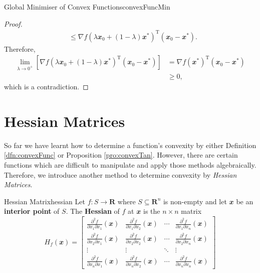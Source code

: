\documentclass[math, code]{amznotes}
\theoremstyle{remark}
\begin{document}
\begin{thmbox}{Global Minimiser of Convex Functions}{convexFuncMin}
\begin{proof}
\begin{align*}
            & \leq \nabla f\left(\lambda\mathbfit{x}_0 + (1 - \lambda)\mathbfit{x}^*\right)^{\mathrm{T}}(\mathbfit{x_0 - x^*}).
        \end{align*}
        Therefore,
        \begin{align*}
            \lim_{\lambda \to 0^+}\left[\nabla f\left(\lambda\mathbfit{x}_0 + (1 - \lambda)\mathbfit{x}^*\right)^{\mathrm{T}}(\mathbfit{x_0 - x^*})\right] & = \nabla f(\mathbfit{x}^*)^{\mathrm{T}}(\mathbfit{x_0 - x^*}) \\
            & \geq 0,
        \end{align*}
        which is a contradiction.
    \end{proof}
\end{thmbox}

\section{Hessian Matrices}
So far we have learnt how to determine a function's convexity by either Definition \ref{dfn:convexFunc} or Proposition \ref{pro:convexTan}. However, there are certain functions which are difficult to manipulate and apply those methods algebraically. Therefore, we introduce another method to determine convexity by \textit{Hessian Matrices}.
\begin{dfnbox}{Hessian Matrix}{hessian}
    Let $f \colon S \to \mathbf{R}$ where $S \subseteq \mathbf{R}^n$ is non-empty and let $\mathbfit{x}$ be an {\color{red} \textbf{interior point}} of $S$. The {\color{red} \textbf{Hessian}} of $f$ at $\mathbfit{x}$ is the $n \times n$ matrix
    \begin{displaymath}
        H_f(\mathbfit{x}) = \begin{bmatrix}
            \frac{\partial^2f}{\partial x_1 \partial x_1}(\mathbfit{x}) & \frac{\partial^2f}{\partial x_1 \partial x_2}(\mathbfit{x}) & \cdots & \frac{\partial^2f}{\partial x_1 \partial x_n}(\mathbfit{x}) \\
            \frac{\partial^2f}{\partial x_2 \partial x_1}(\mathbfit{x}) & \frac{\partial^2f}{\partial x_2 \partial x_2}(\mathbfit{x}) & \cdots & \frac{\partial^2f}{\partial x_2 \partial x_n}(\mathbfit{x}) \\
            \vdots & \vdots & \ddots & \vdots \\
            \frac{\partial^2f}{\partial x_n \partial x_1}(\mathbfit{x}) & \frac{\partial^2f}{\partial x_n \partial x_2}(\mathbfit{x}) & \cdots & \frac{\partial^2f}{\partial x_n \partial x_n}(\mathbfit{x})
        \end{bmatrix}
    \end{displaymath}
\end{dfnbox}
\end{document}
